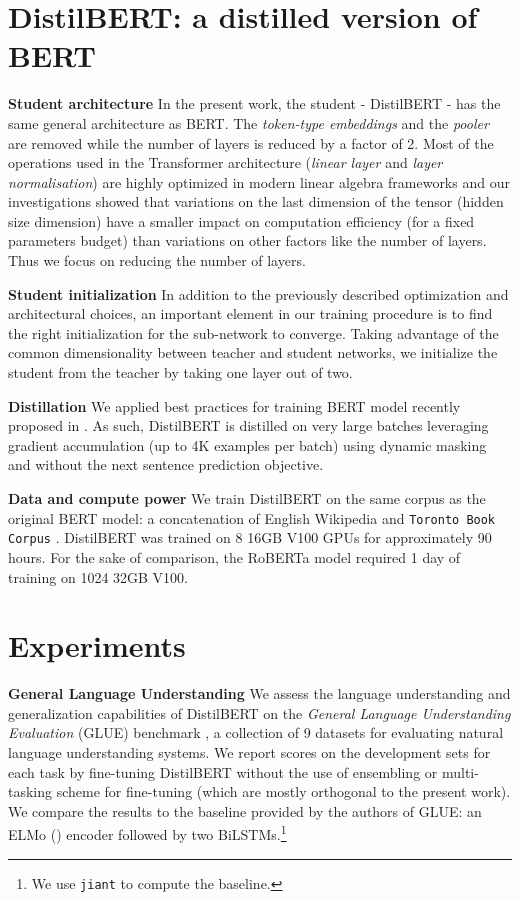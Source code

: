 \documentclass{article}
\begin{document}
\section{DistilBERT: a distilled version of BERT}

\textbf{Student architecture} In the present work, the student - DistilBERT - has the same general architecture as BERT. The \textit{token-type embeddings} and the \textit{pooler} are removed while the number of layers is reduced by a factor of 2. Most of the operations used in the Transformer architecture (\textit{linear layer} and \textit{layer normalisation}) are highly optimized in modern linear algebra frameworks and our investigations showed that variations on the last dimension of the tensor (hidden size dimension) have a smaller impact on computation efficiency (for a fixed parameters budget) than variations on other factors like the number of layers. Thus we focus on reducing the number of layers.

\textbf{Student initialization} In addition to the previously described optimization and architectural choices, an important element in our training procedure is to find the right initialization for the sub-network to converge. Taking advantage of the common dimensionality between teacher and student networks, we initialize the student from the teacher by taking one layer out of two.

\textbf{Distillation} We applied best practices for training BERT model recently proposed in \citet{Liu2019RoBERTaAR}. As such, DistilBERT is distilled on very large batches leveraging gradient accumulation (up to 4K examples per batch) using dynamic masking and without the next sentence prediction objective.

\textbf{Data and compute power} We train DistilBERT on the same corpus as the original BERT model: a concatenation of English Wikipedia and \texttt{Toronto Book Corpus} \citep{Zhu2015AligningBA}. DistilBERT was trained on 8 16GB V100 GPUs for approximately 90 hours. For the sake of comparison, the RoBERTa model \citep{Liu2019RoBERTaAR} required 1 day of training on 1024 32GB V100.

\section{Experiments}

\textbf{General Language Understanding} We assess the language understanding and generalization capabilities of DistilBERT on the \textit{General Language Understanding Evaluation} (GLUE) benchmark \citep{Wang2018GLUEAM}, a collection of 9 datasets for evaluating natural language understanding systems. We report scores on the development sets for each task by fine-tuning DistilBERT without the use of ensembling or multi-tasking scheme for fine-tuning (which are mostly orthogonal to the present work). We compare the results to the baseline provided by the authors of GLUE: an ELMo (\citet{Peters2018DeepCW}) encoder followed by two BiLSTMs.\footnote{We use \texttt{jiant} \citep{wang2019jiant} to compute the baseline.}
\end{document}
